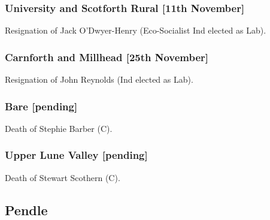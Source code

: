 \documentclass[a4paper,openany]{book}
\begin{document}
\begin{resultsiii}
\subsubsection*{University and Scotforth Rural \hspace*{\fill}\nolinebreak[1]%
	\enspace\hspace*{\fill}
	[11th November]}


Resignation of Jack O'Dwyer-Henry (Eco-Socialist Ind elected as Lab).

\subsubsection*{Carnforth and Millhead \hspace*{\fill}\nolinebreak[1]%
	\enspace\hspace*{\fill}
	[25th November]}


Resignation of John Reynolds (Ind elected as Lab).

\subsubsection*{Bare \hspace*{\fill}\nolinebreak[1]%
	\enspace\hspace*{\fill}
	[pending]}


Death of Stephie Barber (C).

\subsubsection*{Upper Lune Valley \hspace*{\fill}\nolinebreak[1]%
	\enspace\hspace*{\fill}
	[pending]}


Death of Stewart Scothern (C).

\subsection*{Pendle}


\end{resultsiii}
\end{document}
